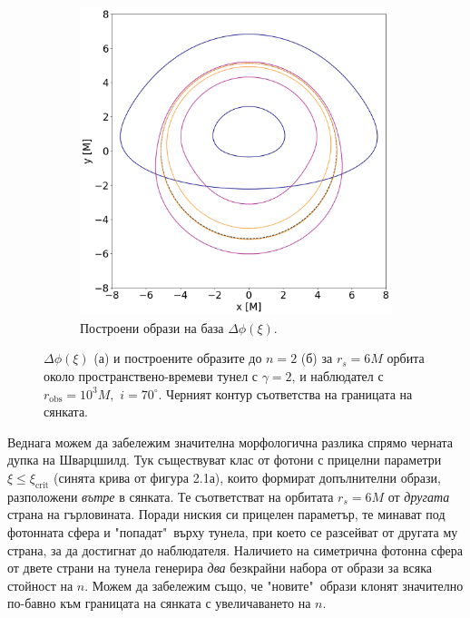 \documentclass[12pt]{article}
\numberwithin{equation}{section}
\numberwithin{figure}{section}
\begin{document}
\begin{figure}[h]
		\begin{subfigure}{6cm}
			\centering
			\includegraphics[scale = 0.3]{Section_6_Morphology_of_the images_of_horizonless_spacetimes/WH_70_deg_r6_gamma_2.png}
			\caption{Построени образи на база $\Delta\phi(\xi)$.\newline} \label{fig:1b}
		\end{subfigure}
		\caption[$\Delta\phi(\xi)$ и образите за $r_s=6M$ орбита около пространствено-времеви тунел до $n = 2$.]{\small $\Delta\phi(\xi)$ (а) и построените образите до $n = 2$ (б) за $r_s=6M$ орбита около пространствено-времеви тунел с $\gamma = 2$, и наблюдател с $r_\text{obs} = 10^3M,\,\,i = 70^\circ$. Черният контур съответства на границата на сянката.} 
		\label{WH_r6_orbit}
	\end{figure}
	
	Веднага можем да забележим значителна морфологична разлика спрямо черната дупка на Шварцшилд. Тук съществуват клас от фотони с прицелни параметри $\xi \le \xi_\text{crit}$ (синята крива от фигура 2.1а), които формират допълнителни образи, разположени \emph{вътре} в сянката. Те съответстват на орбитата $r_s = 6M$ от \emph{другата} страна на гърловината. Поради ниския си прицелен параметър, те минават под фотонната сфера и "попадат"$\,$ върху тунела, при което се разсейват от другата му страна, за да достигнат до наблюдателя. Наличието на симетрична фотонна сфера от двете страни на тунела генерира \emph{два} безкрайни набора от образи за всяка стойност на $n$. Можем да забележим също, че "новите"$\,$ образи клонят значително по-бавно към границата на сянката с увеличаването на $n$.\\
	
\end{document}
